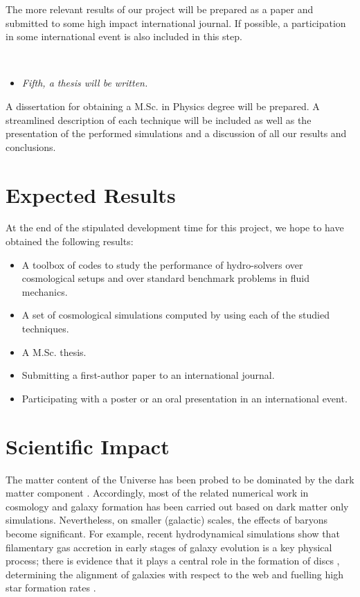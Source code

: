 \documentclass[a4,useAMS,usenatbib,usegraphicx,12pt]{article}
\begin{document}
The more relevant results of our project will be prepared as a paper and 
submitted to some high impact international journal. If possible, a participation
in some international event is also included in this step.

\

\begin{itemize}
\item[\checkmark] \textit{Fifth, a thesis will be written.}
\end{itemize}


A dissertation for obtaining a M.Sc. in Physics degree will be prepared. A
streamlined description of each technique will be included as well as the 
presentation of the performed simulations and a discussion of all our results
and conclusions.


\section{Expected Results}
At the end of the stipulated development time for this project, we hope to have
obtained the following results:
\begin{itemize}
\item A toolbox of codes to study the performance of hydro-solvers over 
cosmological setups and over standard benchmark problems in fluid mechanics.
\item A set of cosmological simulations computed by using each of the studied
techniques.
\item A M.Sc. thesis.
\item Submitting a first-author paper to an international journal.
\item Participating with a poster or an oral presentation in an international
event.
\end{itemize}


\section{Scientific Impact}
The matter content of the Universe has been probed to be dominated by the dark 
matter component \citet{Planck13XVI}. Accordingly, most of the related numerical 
work in cosmology and galaxy formation has been carried out based on dark matter 
only simulations. Nevertheless, on smaller (galactic) scales, the effects of 
baryons become significant. For example, recent hydrodynamical simulations show 
that filamentary gas accretion in early stages of galaxy evolution is a key 
physical process; there is evidence that it plays a central role in the formation 
of discs \citet{Dubois14}, determining the alignment of galaxies with respect to 
the web \citet{Hahn10} and fuelling high star formation rates \citet{Dekel09}.
\end{document}
